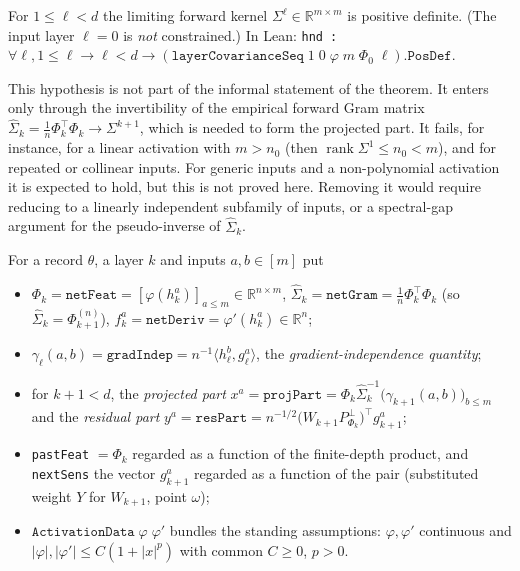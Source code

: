\begin{remark}\label{hyp:ntkdn:nondeg}
For $1\le\ell<d$ the limiting forward kernel $\Sigma^\ell\in\mathbb R^{m\times m}$ is positive definite. (The input layer $\ell=0$ is \emph{not} constrained.) In Lean: \texttt{hnd :$\forall\ell,1\le\ell\to\ell<d\to(\texttt{layerCovarianceSeq}\;1\;0\;\varphi\;m\;\Phi_0\;\ell).\texttt{PosDef}$}.
\end{remark}

This hypothesis is not part of the informal statement of the theorem. It enters only through the invertibility of the empirical forward Gram matrix $\hat\Sigma_k=\frac1n\Phi_k^\top\Phi_k\to\Sigma^{k+1}$, which is needed to form the projected part. It fails, for instance, for a linear activation with $m>n_0$ (then $\operatorname{rank}\Sigma^1\le n_0<m$), and for repeated or collinear inputs. For generic inputs and a non-polynomial activation it is expected to hold, but this is not proved here. Removing it would require reducing to a linearly independent subfamily of inputs, or a spectral-gap argument for the pseudo-inverse of $\hat\Sigma_k$.

\begin{definition}\label{def:ntkdn:netDefs}
  \leanok
For a record $\theta$, a layer $k$ and inputs $a,b\in[m]$ put
\begin{itemize}
  \item $\Phi_k=\texttt{netFeat}=[\varphi(h_k^a)]_{a\le m}\in\mathbb R^{n\times m}$, $\hat\Sigma_k=\texttt{netGram}=\frac1n\Phi_k^\top\Phi_k$ (so $\hat\Sigma_k=\Phi_{k+1}^{(n)}$), $f_k^a=\texttt{netDeriv}=\varphi'(h_k^a)\in\mathbb R^n$;
  \item $\gamma_\ell(a,b)=\texttt{gradIndep}=n^{-1}\langle h_\ell^b,g_\ell^a\rangle$, the \emph{gradient-independence quantity};
  \item for $k+1<d$, the \emph{projected part} $x^a=\texttt{projPart}=\Phi_k\hat\Sigma_k^{-1}\bigl(\gamma_{k+1}(a,b)\bigr)_{b\le m}$ and the \emph{residual part} $y^a=\texttt{resPart}=n^{-1/2}\bigl(W_{k+1}P_{\Phi_k}^\perp\bigr)^\top g_{k+1}^a$;
  \item \texttt{pastFeat} $=\Phi_k$ regarded as a function of the finite-depth product, and
    \texttt{nextSens} the vector $g_{k+1}^a$ regarded as a function of the pair (substituted
    weight $Y$ for $W_{k+1}$, point $\omega$);
  \item $\texttt{ActivationData}\;\varphi\;\varphi'$ bundles the standing assumptions: $\varphi,\varphi'$ continuous and $|\varphi|,|\varphi'|\le C(1+|x|^p)$ with common $C\ge0$, $p>0$.
\end{itemize}
\end{definition}

